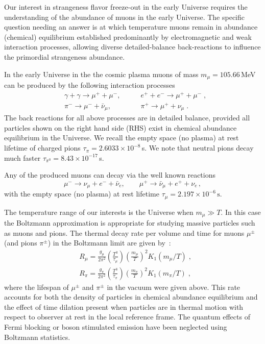 \label{section_muon}
Our interest in strangeness flavor freeze-out in the early Universe requires the understanding of the abundance of muons in the early Universe. The specific question needing an answer is at which temperature muons remain in abundance (chemical) equilibrium established predominantly by electromagnetic and weak interaction processes, allowing diverse detailed-balance back-reactions to influence the primordial strangeness abundance.

In the early Universe in the the cosmic plasma muons of mass $m_\mu=105.66$\,MeV can be produced by the following interaction processes~\cite{Yang:2024ret,Rafelski:2021aey}
\begin{align} 
&\gamma+\gamma\longrightarrow\mu^++\mu^-,\qquad & e^++e^-\longrightarrow \mu^++\mu^-\;,\\
&\pi^-\longrightarrow\mu^-+\bar{\nu}_\mu,\qquad & \pi^+\longrightarrow\mu^++\nu_\mu\;.
\end{align}
The back reactions for all above processes are in detailed balance, provided all particles shown on the right hand side (RHS) exist in chemical abundance equilibrium in the Universe. We recall the empty space (no plasma) at rest lifetime of charged pions $\tau_\pi=2.6033\times 10^{-8}$\,s. We note that neutral pions decay much faster $\tau_{\pi^0}=8.43\times 10^{-17}$\,s.

Any of the produced muons can decay via the well known reactions
\begin{equation}
\mu^-\rightarrow\nu_\mu+e^-+\bar{\nu}_e,\qquad \mu^+\rightarrow\bar{\nu}_\mu+e^++\nu_e\,,
\end{equation} 
with the empty space (no plasma) at rest lifetime $\tau_{\mu}=2.197 \times 10^{-6}\,\mathrm{s}$.  
 
The temperature range of our interests is the Universe when $m_\mu\gg T$. In this case  the Boltzmann approximation is appropriate for studying massive particles such as muons and pions. The thermal decay rate per volume and time  for muons $\mu^\pm$ (and pions $\pi^\pm$) in the Boltzmann limit  are given by~\cite{Kuznetsova:2010pi}:
\begin{align}
&R_\mu=\frac{g_\mu}{2\pi^2}\left(\frac{T^3}{\tau_\mu}\right)\left(\frac{m_\mu}{T}\right)^2K_1(m_\mu/T)\;,\\
&R_\pi=\frac{g_\pi}{2\pi^2}\left(\frac{T^3}{\tau_\pi}\right)\left(\frac{m_\pi}{T}\right)^2K_1(m_\pi/T)\;, 
\end{align}
where the lifespan of $\mu^\pm$ and $\pi^\pm$ in the vacuum were given above. This rate accounts for both the density of particles in chemical abundance equilibrium and the effect of time dilation present when particles are in thermal motion with respect to observer at rest in the local reference frame. The quantum effects of Fermi blocking or boson stimulated emission have been neglected using Boltzmann statistics.

